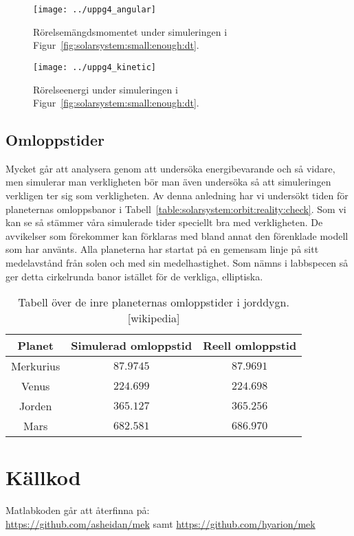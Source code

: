 \documentclass[a4]{article}
\begin{document}
\begin{figure}
\begin{center}
	\texttt{[image: ../uppg4\_angular]}
\end{center}
\caption{Rörelsemängdsmomentet under simuleringen i Figur~\vref{fig:solarsystem:small:enough:dt}.}
\label{fig:solarsystem:angularmomentum}
\end{figure}

\begin{figure}
\begin{center}
	\texttt{[image: ../uppg4\_kinetic]}
\end{center}
\caption{Rörelseenergi under simuleringen i Figur~\vref{fig:solarsystem:small:enough:dt}.}
\label{fig:solarsystem:kineticenergy}
\end{figure}

		\subsection{Omloppstider}
Mycket går att analysera genom att undersöka energibevarande och så vidare, men
simulerar man verkligheten bör man även undersöka så att simuleringen verkligen
ter sig som verkligheten.
Av denna anledning har vi undersökt tiden för planeternas omloppsbanor i
Tabell~\vref{table:solarsystem:orbit:reality:check}.
Som vi kan se så stämmer våra simulerade tider speciellt bra med
verkligheten.
De avvikelser som förekommer kan förklaras med bland annat den förenklade modell som har använts.
Alla planeterna har startat på en gemensam linje på sitt medelavstånd från solen och med sin medelhastighet.
Som nämns i labbspecen så ger detta cirkelrunda banor istället för de verkliga, elliptiska.


\begin{table}
\begin{center}
\begin{tabular}{c|c|c}
	Planet    & Simulerad omloppstid & Reell omloppstid \\
	\hline
	Merkurius & $87.9745$ &  $87.9691$ \\
	Venus     & $224.699$ &  $224.698$ \\ 
	Jorden    & $365.127$ &  $365.256$ \\
	Mars      & $682.581$ &  $686.970$
\end{tabular}
\caption{
	Tabell över de inre planeternas omloppstider i jorddygn.[wikipedia]
}
\label{table:solarsystem:orbit:reality:check}
\end{center}
\end{table}

\section{Källkod}
	Matlabkoden går att återfinna på:\\
	\url{https://github.com/asheidan/mek} samt
	\url{https://github.com/hyarion/mek}
	
\end{document}

